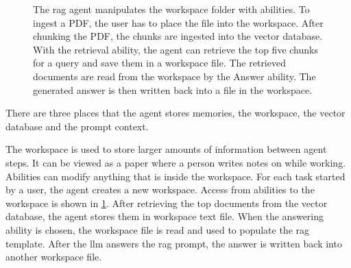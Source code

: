 \documentclass[../main.tex]{subfiles}
\begin{document}
\begin{figure}[t]
    \centering
    \caption{The \gls{rag} agent manipulates the \textcolor{emph red}{workspace}
        folder with \textcolor{emph blue}{abilities}.
        To ingest a PDF, the user has to place the file into the workspace.
        After chunking the PDF, the chunks are ingested into the vector database.
        With the retrieval ability,
        the agent can retrieve the top five chunks for a query
        and save them in a workspace file.
        The retrieved documents are read from the workspace by the Answer ability.
        The generated answer is then written back into a file in the workspace.}
    \label{fig:abilities_workspace}
\end{figure}


There are three places that the agent stores memories, the workspace,
the vector database and the prompt context.

The workspace is used to store larger amounts of information between agent steps.
It can be viewed as a paper where a person writes notes on while working.
Abilities can modify anything that is inside the workspace.
For each task started by a user, the agent creates a new workspace.
Access from abilities to the workspace is shown in \ref{fig:abilities_workspace}.
After retrieving the top documents from the vector database, the agent stores
them in workspace text file.
When the answering ability is chosen, the workspace file is read and used to populate
the \gls{rag} template.
After the \gls{llm} answers the \gls{rag} prompt, the answer is written back
into another workspace file.
\end{document}
